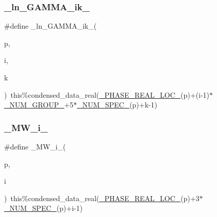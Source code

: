 \mbox{\label{sub__model___u_n_i_f_a_c_8_f90_ac2efe912048381d499ebfed7c0757bb3}} 
\subsubsection{\texorpdfstring{\+\_\+ln\+\_\+\+G\+A\+M\+M\+A\+\_\+ik\+\_\+}{\_ln\_GAMMA\_ik\_}}
{\footnotesize\ttfamily \#define \+\_\+ln\+\_\+\+G\+A\+M\+M\+A\+\_\+ik\+\_\+(\begin{DoxyParamCaption}\item[{}]{p,  }\item[{}]{i,  }\item[{}]{k }\end{DoxyParamCaption})~this\%condensed\+\_\+data\+\_\+real(\mbox{\hyperlink{sub__model___u_n_i_f_a_c_8_f90_a82db0e0fff4e8ab602fb50bebe0b7c38}{\+\_\+\+P\+H\+A\+S\+E\+\_\+\+R\+E\+A\+L\+\_\+\+L\+O\+C\+\_\+}}(p)+(i-\/1)$\ast$\mbox{\hyperlink{sub__model___u_n_i_f_a_c_8_f90_aaf6ff3fa100a1fa0baec9dba65df6891}{\+\_\+\+N\+U\+M\+\_\+\+G\+R\+O\+U\+P\+\_\+}}+5$\ast$\mbox{\hyperlink{sub__model___u_n_i_f_a_c_8_f90_a6a6c2afb1b313ca5d982039833f5da8a}{\+\_\+\+N\+U\+M\+\_\+\+S\+P\+E\+C\+\_\+}}(p)+k-\/1)}

\mbox{\label{sub__model___u_n_i_f_a_c_8_f90_ab06b1fecd9a89eabf102a8d03185f5b4}} 
\subsubsection{\texorpdfstring{\+\_\+\+M\+W\+\_\+i\+\_\+}{\_MW\_i\_}}
{\footnotesize\ttfamily \#define \+\_\+\+M\+W\+\_\+i\+\_\+(\begin{DoxyParamCaption}\item[{}]{p,  }\item[{}]{i }\end{DoxyParamCaption})~this\%condensed\+\_\+data\+\_\+real(\mbox{\hyperlink{sub__model___u_n_i_f_a_c_8_f90_a82db0e0fff4e8ab602fb50bebe0b7c38}{\+\_\+\+P\+H\+A\+S\+E\+\_\+\+R\+E\+A\+L\+\_\+\+L\+O\+C\+\_\+}}(p)+3$\ast$\mbox{\hyperlink{sub__model___u_n_i_f_a_c_8_f90_a6a6c2afb1b313ca5d982039833f5da8a}{\+\_\+\+N\+U\+M\+\_\+\+S\+P\+E\+C\+\_\+}}(p)+i-\/1)}

